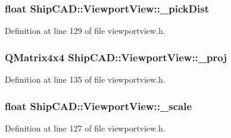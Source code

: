 \subsubsection[{\texorpdfstring{\+\_\+pick\+Dist}{_pickDist}}]{\setlength{\rightskip}{0pt plus 5cm}float Ship\+C\+A\+D\+::\+Viewport\+View\+::\+\_\+pick\+Dist\hspace{0.3cm}{\ttfamily [protected]}}\hypertarget{classShipCAD_1_1ViewportView_a001cda888a20319d4d3b29bd9926d5e1}{}\label{classShipCAD_1_1ViewportView_a001cda888a20319d4d3b29bd9926d5e1}


Definition at line 129 of file viewportview.\+h.

\subsubsection[{\texorpdfstring{\+\_\+proj}{_proj}}]{\setlength{\rightskip}{0pt plus 5cm}Q\+Matrix4x4 Ship\+C\+A\+D\+::\+Viewport\+View\+::\+\_\+proj\hspace{0.3cm}{\ttfamily [protected]}}\hypertarget{classShipCAD_1_1ViewportView_abb5933e4e5cbe5c97be2b63164cc8380}{}\label{classShipCAD_1_1ViewportView_abb5933e4e5cbe5c97be2b63164cc8380}


Definition at line 135 of file viewportview.\+h.

\subsubsection[{\texorpdfstring{\+\_\+scale}{_scale}}]{\setlength{\rightskip}{0pt plus 5cm}float Ship\+C\+A\+D\+::\+Viewport\+View\+::\+\_\+scale\hspace{0.3cm}{\ttfamily [protected]}}\hypertarget{classShipCAD_1_1ViewportView_a808cc636969188f7c04c97902ecbe9d5}{}\label{classShipCAD_1_1ViewportView_a808cc636969188f7c04c97902ecbe9d5}


Definition at line 127 of file viewportview.\+h.

